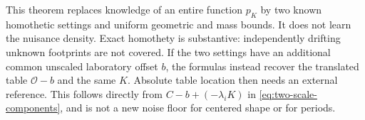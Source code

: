 \begin{remark}
\label{rem:self-contract}
This theorem replaces knowledge of an entire function $p_K$ by two
known homothetic settings and uniform geometric and mass bounds. It
does not learn the nuisance density. Exact homothety is substantive:
independently drifting unknown footprints are not covered. If the two
settings have an additional common unscaled laboratory offset $b$, the
formulas instead recover the translated table $\mathcal O-b$ and the
same $K$. Absolute table location then needs an external reference.
This follows directly from
$C-b+(-\lambda_iK)$ in \eqref{eq:two-scale-components}, and is not
a new noise floor for centered shape or for periods.
\end{remark}
